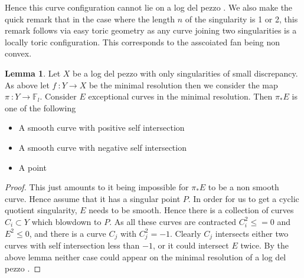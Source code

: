 \documentclass[11pt]{report}
\theoremstyle{definition}
\theoremstyle{definition}
\theoremstyle{definition}
\theoremstyle{definition}
\theoremstyle{definition}
\newtheorem{lem}[thm]{Lemma}
\theoremstyle{definition}
\theoremstyle{definition}
\theoremstyle{definition}
\newcommand{\ldp}{log del pezzo }
\newcommand{\minres}{minimal resolution }
\begin{document}
Hence this curve configuration cannot lie on a \ldp. We also make the quick remark that in the case where the length $n$ of the singularity is 1 or 2, this remark follows via easy toric geometry as any curve joining two singularities is a locally toric configuration. This corresponds to the asscoiated fan being non convex. 
\begin{lem}
Let $X$ be a \ldp with only singularities of small discrepancy. As above let $f \: : Y \rightarrow X$ be the \minres then we consider the map $\pi \: : Y \rightarrow \mathbb{F}_l$. Consider $E$ exceptional curves in the minimal resolution. Then $\pi_* E$ is one of the following 
\begin{itemize}
\item A smooth curve with positive self intersection
\item A smooth curve with negative self intersection
\item A point
\end{itemize}
\end{lem}
\begin{proof}
This just amounts to it being impossible for $\pi_* E$ to be a non smooth curve. Hence assume that it has a singular point $P$. In order for us to get a cyclic quotient singularity, $E$ needs to be smooth. Hence there is a collection of curves $C_i \subset Y$ which blowdown to $P$. As all these curves are contracted $C_i^2 \leq = 0$ and $E^2 \leq 0$, and there is a curve $C_j$ with $C_j^2 = -1$. Clearly $C_j$ intersects either two curves with self intersection less than $-1$, or it could intersect $E$ twice. By the above lemma neither case could appear on the \minres of a \ldp.
\end{proof}
\end{document}

